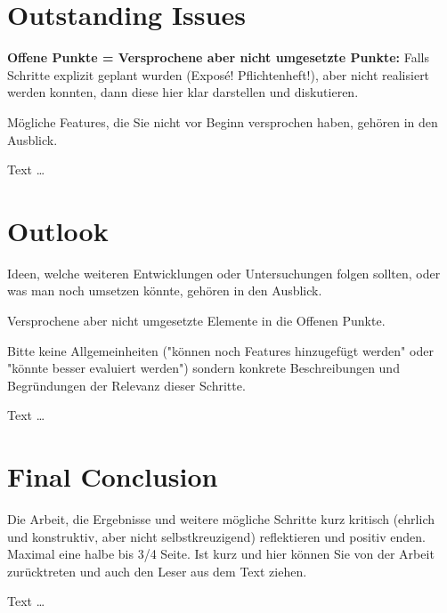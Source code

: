 \documentclass[11pt,a4paper,english]{scrreprt}
\newenvironment{comment}
  {\par\medskip
   \begingroup\color{olive}%
   }
 {\endgroup
  \medskip}
\begin{document}
\section{Outstanding Issues}
\begin{comment}
\textbf{Offene Punkte = Versprochene aber nicht umgesetzte Punkte:} Falls Schritte explizit geplant wurden (Exposé! Pflichtenheft!), aber nicht realisiert werden konnten, dann diese hier klar darstellen und diskutieren.

Mögliche Features, die Sie nicht vor Beginn versprochen haben, gehören in den Ausblick.
\end{comment}

Text \dots

\section{Outlook}
\begin{comment}
Ideen, welche weiteren Entwicklungen oder Untersuchungen folgen sollten, oder was man noch umsetzen könnte, gehören in den Ausblick.

Versprochene aber nicht umgesetzte Elemente in die Offenen Punkte.

Bitte keine Allgemeinheiten ("können noch Features hinzugefügt werden" oder "könnte besser evaluiert werden") sondern konkrete Beschreibungen und Begründungen der Relevanz dieser Schritte.
\end{comment}

Text \dots

\section{Final Conclusion}
\begin{comment}
Die Arbeit, die Ergebnisse und weitere mögliche Schritte kurz kritisch (ehrlich und konstruktiv, aber nicht selbstkreuzigend) reflektieren und positiv enden. Maximal eine halbe bis 3/4 Seite.
Ist kurz und hier können Sie von der Arbeit zurücktreten und auch den Leser aus dem Text ziehen.
\end{comment}

Text \dots

\clearpage

\end{document}
